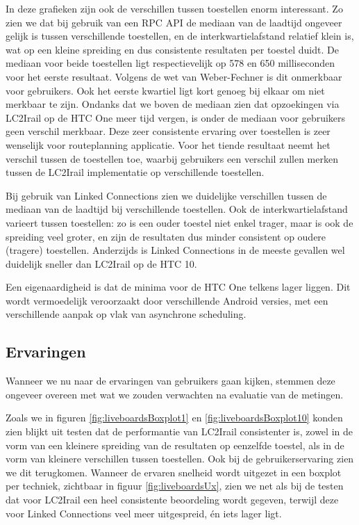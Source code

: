 In deze grafieken zijn ook de verschillen tussen toestellen enorm interessant. Zo zien we dat bij gebruik van een RPC API de mediaan van de laadtijd ongeveer gelijk is tussen verschillende toestellen, en de interkwartielafstand relatief klein is, wat op een kleine spreiding en dus consistente resultaten per toestel duidt. De mediaan voor beide toestellen ligt respectievelijk op 578 en 650 milliseconden voor het eerste resultaat. Volgens de wet van Weber-Fechner is dit onmerkbaar voor gebruikers. Ook het eerste kwartiel ligt kort genoeg bij elkaar om niet merkbaar te zijn. Ondanks dat we boven de mediaan zien dat opzoekingen via LC2Irail op de HTC One meer tijd vergen, is onder de mediaan voor gebruikers geen verschil merkbaar. Deze zeer consistente ervaring over toestellen is zeer wenselijk voor routeplanning applicatie. Voor het tiende resultaat neemt het verschil tussen de toestellen toe, waarbij gebruikers een verschil zullen merken tussen de LC2Irail implementatie op verschillende toestellen.

Bij gebruik van Linked Connections zien we duidelijke verschillen tussen de mediaan van de laadtijd bij verschillende toestellen. Ook de interkwartielafstand varieert tussen toestellen: zo is een ouder toestel niet enkel trager, maar is ook de spreiding veel groter, en zijn de resultaten dus minder consistent op oudere (tragere) toestellen. Anderzijds is Linked Connections in de meeste gevallen wel duidelijk sneller dan LC2Irail op de HTC 10.

Een eigenaardigheid is dat de minima voor de HTC One telkens lager liggen. Dit wordt vermoedelijk veroorzaakt door verschillende Android versies, met een verschillende aanpak op vlak van asynchrone scheduling.

\subsection{Ervaringen}
Wanneer we nu naar de ervaringen van gebruikers gaan kijken, stemmen deze ongeveer overeen met wat we zouden verwachten na evaluatie van de metingen.

Zoals we in figuren \ref{fig:liveboardsBoxplot1} en \ref{fig:liveboardsBoxplot10} konden zien blijkt uit testen dat de performantie van LC2Irail consistenter is, zowel in de vorm van een kleinere spreiding van de resultaten op eenzelfde toestel, als in de vorm van kleinere verschillen tussen toestellen. Ook bij de gebruikerservaring zien we dit terugkomen. Wanneer de ervaren snelheid wordt uitgezet in een boxplot per techniek, zichtbaar in figuur \ref{fig:liveboardsUx}, zien we net als bij de testen dat voor LC2Irail een heel consistente beoordeling wordt gegeven, terwijl deze voor Linked Connections veel meer uitgespreid, én iets lager ligt.

